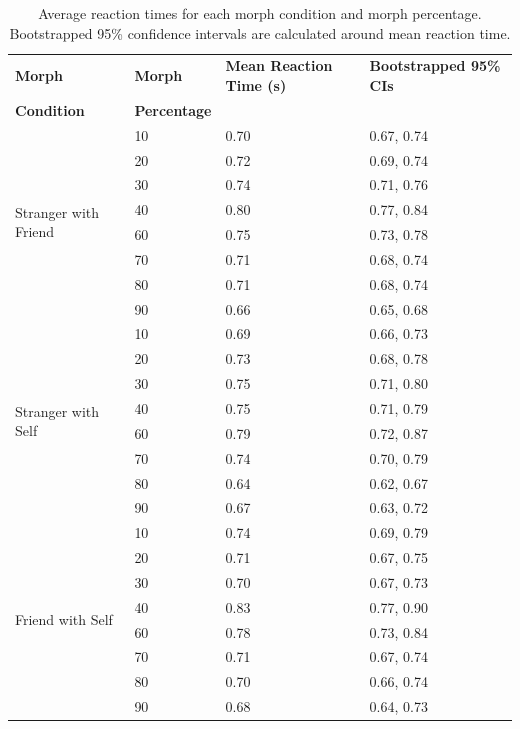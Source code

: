 \documentclass[10pt,letterpaper]{article}
\begin{document}
\begin{table}[ht]
\begin{center}
\caption{\color{Gray} Average reaction times for each morph condition and morph percentage. Bootstrapped 95\% confidence intervals are calculated around mean reaction time.}
\label{Table 8}
\begin{tabular}{ | m{3.0cm} | m{3.00cm} | m{3.00cm} | m{2.75cm} |}
\hline
\textbf{Morph} & \textbf{Morph} & \textbf{Mean Reaction Time (s)} & \textbf{Bootstrapped 95\% CIs} \\
\textbf{Condition} & \textbf{Percentage} &  &  \\
\hline
\multirow{8}{2em}{Stranger with Friend} & 10 & 0.70 & 0.67, 0.74 \\
& 20 & 0.72 & 0.69, 0.74 \\
& 30 & 0.74 & 0.71, 0.76 \\
& 40 & 0.80 & 0.77, 0.84 \\
& 60 & 0.75 & 0.73, 0.78 \\
& 70 & 0.71 & 0.68, 0.74 \\
& 80 & 0.71 & 0.68, 0.74 \\
& 90 & 0.66 & 0.65, 0.68 \\
\hline
\multirow{8}{2em}{Stranger with Self} &10 & 0.69 & 0.66, 0.73 \\
& 20 & 0.73 & 0.68, 0.78 \\
& 30 & 0.75 & 0.71, 0.80 \\
& 40 & 0.75 & 0.71, 0.79 \\
& 60 & 0.79 & 0.72, 0.87 \\
& 70 & 0.74 & 0.70, 0.79 \\
& 80 & 0.64 & 0.62, 0.67 \\
& 90 & 0.67 & 0.63, 0.72 \\
\hline
\multirow{8}{2em}{Friend with Self} & 10 & 0.74 & 0.69, 0.79 \\
& 20 & 0.71 & 0.67, 0.75 \\ 
& 30 & 0.70 & 0.67, 0.73 \\
& 40 & 0.83 & 0.77, 0.90 \\
& 60 & 0.78 & 0.73, 0.84 \\
& 70 & 0.71 & 0.67, 0.74 \\
& 80 & 0.70 & 0.66, 0.74 \\
& 90 & 0.68 & 0.64, 0.73 \\

\end{tabular}
\end{center}
\end{table}
\end{document}
